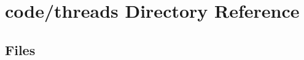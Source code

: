 \section{code/threads Directory Reference}
\label{dir_9f2db50d4588c0c8d7c60f6cbede5bdc}
\subsection*{Files}
\begin{DoxyCompactItemize}
\end{DoxyCompactItemize}
